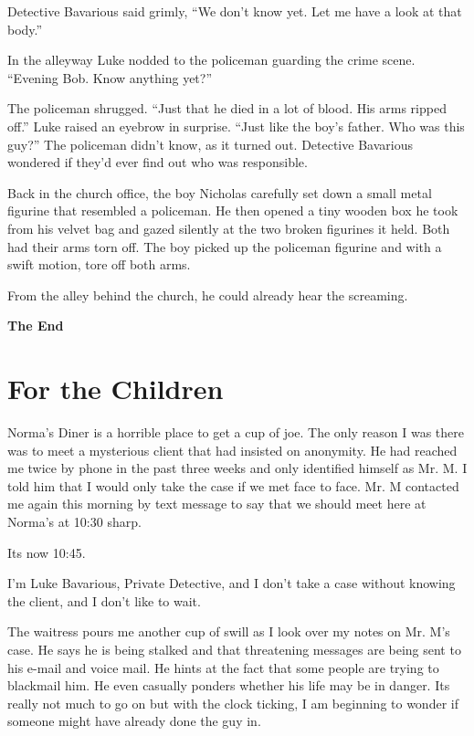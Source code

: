 Detective Bavarious said grimly, ``We don't know yet. Let me have a
look at that body.''

In the alleyway Luke nodded to the policeman guarding the crime
scene. ``Evening Bob. Know anything yet?''

The policeman shrugged. ``Just that he died in a lot of blood. His
arms ripped off.'' Luke raised an eyebrow in surprise. ``Just like
the boy's father. Who was this guy?'' The policeman didn't know, as
it turned out. Detective Bavarious wondered if they'd ever find out
who was responsible.

Back in the church office, the boy Nicholas carefully set down a
small metal figurine that resembled a policeman. He then opened a
tiny wooden box he took from his velvet bag and gazed silently at
the two broken figurines it held. Both had their arms torn off. The
boy picked up the policeman figurine and with a swift motion, tore
off both arms.

From the alley behind the church, he could already hear the
screaming.



{\bf The End} 
 




\chapter{For the Children}



Norma's Diner is a horrible place to get a cup of joe. The only
reason I was there was to meet a mysterious client that had
insisted on anonymity. He had reached me twice by phone in the past
three weeks and only identified himself as Mr. M. I told him that I
would only take the case if we met face to face. Mr. M contacted me
again this morning by text message to say that we should meet here
at Norma's at 10:30 sharp.



Its now 10:45.



I'm Luke Bavarious, Private Detective, and I don't take a case
without knowing the client, and I don't like to wait.



The waitress pours me another cup of swill as I look over my notes
on Mr. M's case. He says he is being stalked and that threatening
messages are being sent to his e-mail and voice mail. He hints at
the fact that some people are trying to blackmail him. He even
casually ponders whether his life may be in danger. Its really not
much to go on but with the clock ticking, I am beginning to wonder
if someone might have already done the guy in.



